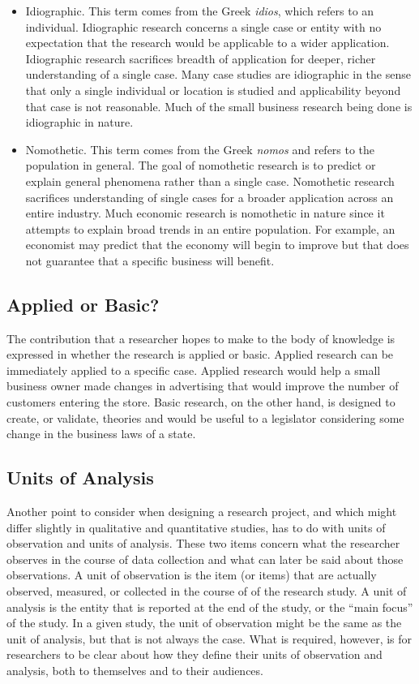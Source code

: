 \begin{itemize}
	\item Idiographic. This term comes from the Greek \textit{idios}, which refers to an individual. Idiographic research concerns a single case or entity with no expectation that the research would be applicable to a wider application. Idiographic research sacrifices breadth of application for deeper, richer understanding of a single case. Many case studies are idiographic in the sense that only a single individual or location is studied and applicability beyond that case is not reasonable. Much of the small business research being done is idiographic in nature.
	\item Nomothetic. This term comes from the Greek \textit{nomos} and refers to the population in general. The goal of nomothetic research is to predict or explain general phenomena rather than a single case. Nomothetic research sacrifices understanding of single cases for a broader application across an entire industry. Much economic research is nomothetic in nature since it attempts to explain broad trends in an entire population. For example, an economist may predict that the economy will begin to improve but that does not guarantee that a specific business will benefit.
\end{itemize}

\subsection{Applied or Basic?}

The contribution that a researcher hopes to make to the body of knowledge is expressed in whether the research is applied or basic. Applied research can be immediately applied to a specific case. Applied research would help a small business owner made changes in advertising that would improve the number of customers entering the store. Basic research, on the other hand, is designed to create, or validate, theories and would be useful to a legislator considering some change in the business laws of a state.

\subsection{Units of Analysis}

Another point to consider when designing a research project, and which might differ slightly in qualitative and quantitative studies, has to do with units of observation and units of analysis. These two items concern what the researcher observes in the course of data collection and what can later be said about those observations. A unit of observation is the item (or items) that are actually observed, measured, or collected in the course of of the research study. A unit of analysis is the entity that is reported at the end of the study, or the ``main focus'' of the study. In a given study, the unit of observation might be the same as the unit of analysis, but that is not always the case. What is required, however, is for researchers to be clear about how they define their units of observation and analysis, both to themselves and to their audiences.

